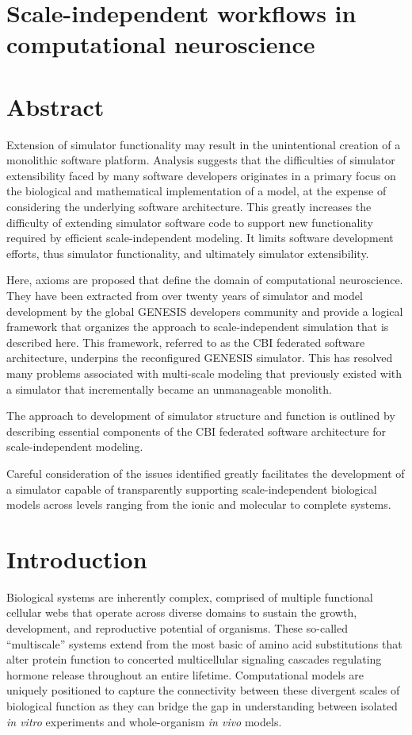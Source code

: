 \documentclass{article}
\begin{document}
\section*{Scale-independent workflows in computational neuroscience}

\section*{Abstract}

Extension of simulator functionality may result in the unintentional creation of a monolithic software platform.  Analysis suggests that the difficulties of simulator extensibility faced by many software developers originates in a primary focus on the biological and mathematical implementation of a model, at the expense of considering the underlying software architecture. This greatly increases the difficulty of extending simulator software code to support new functionality required by efficient scale-independent modeling.  It limits software development efforts, thus simulator functionality, and ultimately simulator extensibility. 

Here, axioms are proposed that define the domain of computational neuroscience. They have been extracted from over twenty years of simulator and model development by the global GENESIS developers community and provide a logical framework that organizes the approach to scale-independent simulation that is described here. This framework, referred to as the CBI federated software architecture, underpins the reconfigured GENESIS simulator.  This has resolved many problems associated with multi-scale modeling that previously existed with a simulator that incrementally became an unmanageable monolith.  

The approach to development of simulator structure and function is outlined by describing essential components of the CBI federated software architecture for scale-independent modeling.

Careful consideration of the issues identified greatly facilitates the development of a simulator capable of transparently supporting scale-independent biological models across levels ranging from the ionic and molecular to complete systems.


\section{Introduction}

Biological systems are inherently complex, comprised of multiple functional cellular webs that operate across diverse domains to sustain the growth, development, and reproductive potential of organisms. These so-called “multiscale” systems extend from the most basic of amino acid substitutions that alter protein function to concerted multicellular signaling cascades regulating hormone release throughout an entire lifetime. Computational models are uniquely positioned to capture the connectivity between these divergent scales of biological function as they can bridge the gap in understanding between isolated \textit{in vitro} experiments and whole-organism \textit{in vivo} models.
\end{document}
